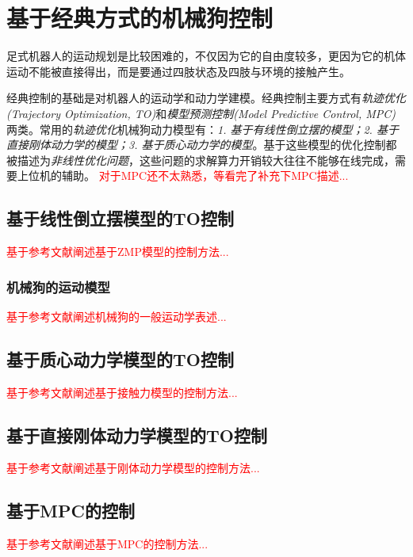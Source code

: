 
\chapter{基于经典方式的机械狗控制}

足式机器人的运动规划是比较困难的，不仅因为它的自由度较多，更因为它的机体运动不能被直接得出，而是要通过四肢状态及四肢与环境的接触产生。

经典控制的基础是对机器人的运动学和动力学建模。经典控制主要方式有\emph{轨迹优化(Trajectory Optimization, TO)}和\emph{模型预测控制(Model Predictive Control, MPC)}两类。常用的\emph{轨迹优化}机械狗动力模型有：\emph{1. 基于有线性倒立摆的模型；2. 基于直接刚体动力学的模型；3. 基于质心动力学的模型}。基于这些模型的优化控制都被描述为\emph{非线性优化问题}，这些问题的求解算力开销较大往往不能够在线完成，需要上位机的辅助。
\textcolor{red}{\small
对于MPC还不太熟悉，等看完了补充下MPC描述...
}


\section[基于线性倒立摆模型的控制]{基于线性倒立摆模型的TO控制\cite[p2-5]{Bellicoso_Jenelten_Fankhauser_Gehring_Hwangbo_Hutter_2017}}
\textcolor{red}{\small
基于参考文献阐述基于ZMP模型的控制方法...
}


\subsection[机械狗的运动模型]{机械狗的运动模型}
\textcolor{red}{\small
基于参考文献阐述机械狗的一般运动学表述...
}
\section[基于质心动力学模型的控制]{基于质心动力学模型的TO控制\cite[p2-6]{Winkler_Bellicoso_Hutter_Buchli_2018}}

\textcolor{red}{\small
基于参考文献阐述基于接触力模型的控制方法...
}

\section[基于直接刚体动力学模型的控制]{基于直接刚体动力学模型的TO控制\cite[p2-6]{Pardo_Neunert_Winkler_Grandia_Buchli_2017}}
\textcolor{red}{\small
基于参考文献阐述基于刚体动力学模型的控制方法...
}
\section[基于MPC的控制]{基于MPC的控制\cite[p2-4]{Neunert_Stauble_Giftthaler_Bellicoso_Carius_Gehring_Hutter_Buchli_2018}}

\textcolor{red}{\small
基于参考文献阐述基于MPC的控制方法...
}